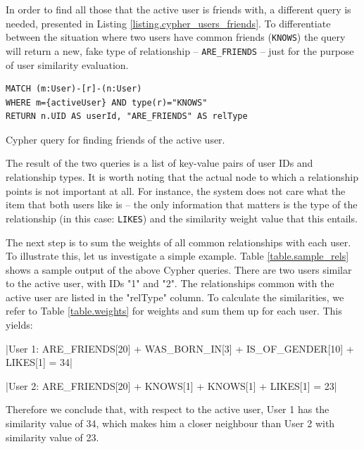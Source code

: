 \documentclass[12pt]{report}
\begin{document}
In order to find all those that the active user is friends with, a different query is needed, presented in Listing \ref{listing.cypher_users_friends}. To differentiate between the situation where two users have common friends (\texttt{KNOWS}) the query will return a new, fake type of relationship -- \texttt{ARE\_FRIENDS} -- just for the purpose of user similarity evaluation.

\begin{listing}
\begin{verbatim}
MATCH (m:User)-[r]-(n:User)
WHERE m={activeUser} AND type(r)="KNOWS"
RETURN n.UID AS userId, "ARE_FRIENDS" AS relType
\end{verbatim}
\caption{Cypher query for finding friends of the active user.}
\label{listing.cypher_users_friends}
\end{listing}

The result of the two queries is a list of key-value pairs of user IDs and relationship types. It is worth noting that the actual node to which a relationship points is not important at all. For instance, the system does not care what the item that both users like is -- the only information that matters is the type of the relationship (in this case: \texttt{LIKES}) and the similarity weight value that this entails.

\hbox{}
The next step is to sum the weights of all common relationships with each user. To illustrate this, let us investigate a simple example. Table \ref{table.sample_rels} shows a sample output of the above Cypher queries. There are two users similar to the active user, with IDs "1" and "2". The relationships common with the active user are listed in the "relType" column. To calculate the similarities, we refer to Table \ref{table.weights} for weights and sum them up for each user. This yields:

|User 1: ARE_FRIENDS[20] + WAS_BORN_IN[3] + IS_OF_GENDER[10] + LIKES[1] = 34|

|User 2: ARE_FRIENDS[20] + KNOWS[1] + KNOWS[1] + LIKES[1] = 23|

Therefore we conclude that, with respect to the active user, User 1 has the similarity value of 34, which makes him a closer neighbour than User 2 with similarity value of 23.
\end{document}
